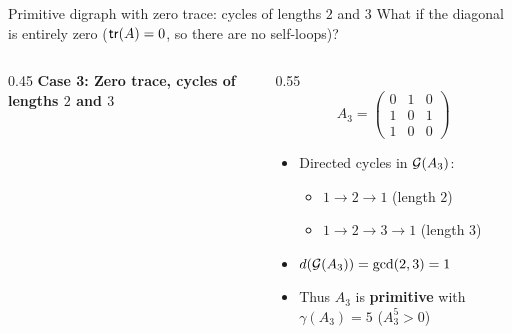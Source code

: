 \documentclass[aspectratio=169]{beamer}\usepackage[]{graphicx}\usepackage[]{xcolor}
\begin{document}
\begin{frame}{Primitive digraph with zero trace: cycles of lengths $2$ and $3$}
What if the diagonal is entirely zero ($\mathsf{tr}(A) = 0$, so there are no self-loops)?
\vfill
\begin{columns}[c]
\begin{column}{0.45\textwidth}
\centering
\textbf{Case 3: Zero trace, cycles of lengths $2$ and $3$}\\[0.3cm]
\end{column}
\begin{column}{0.55\textwidth}
\[
A_3 = \begin{pmatrix} 0 & 1 & 0 \\ 1 & 0 & 1 \\ 1 & 0 & 0 \end{pmatrix}
\]
\vspace{0.2cm}
\begin{itemize}
\item Directed cycles in $\mathcal{G}(A_3)$:
  \begin{itemize}
  \item $1 \to 2 \to 1$ (length $2$)
  \item $1 \to 2 \to 3 \to 1$ (length $3$)
  \end{itemize}
\item $d(\mathcal{G}(A_3)) = \gcd(2, 3) = 1$
\item Thus $A_3$ is \textbf{primitive} with $\gamma(A_3) = 5$ ($A_3^5 > 0$)
\end{itemize}
\end{column}
\end{columns}
\end{frame}
\end{document}
